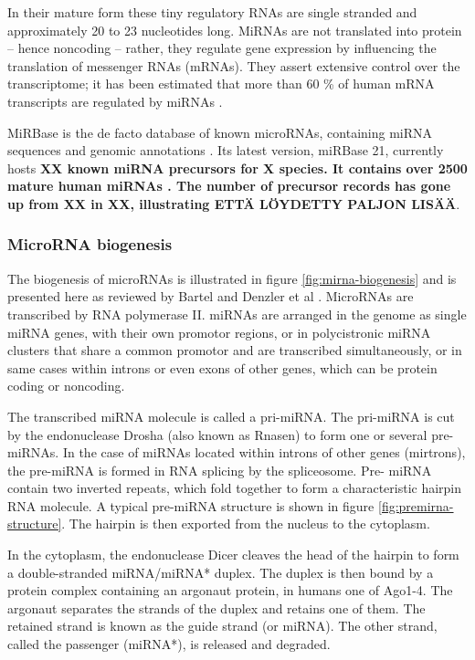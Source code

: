 In their mature form these tiny regulatory RNAs are single stranded and
approximately 20 to 23 nucleotides long. MiRNAs are not translated into
protein -- hence noncoding -- rather, they regulate gene expression by
influencing the translation of messenger RNAs (mRNAs). They assert
extensive control over the transcriptome; it has been estimated that more
than 60 \% of human mRNA transcripts are regulated by miRNAs
\cite{CITE}.

MiRBase is the de facto database of known microRNAs, containing miRNA
sequences and genomic annotations \cite{CITE}. Its latest version, miRBase 21,
currently hosts \textbf{XX known miRNA precursors for X species. It contains
over 2500 mature human miRNAs \cite{CITE}. The number of precursor records has
gone up from XX in XX, illustrating ETTÄ LÖYDETTY PALJON LISÄÄ}.





\subsubsection{MicroRNA biogenesis}\label{microrna-biogenesis}

The biogenesis of microRNAs is illustrated in figure
\ref{fig:mirna-biogenesis} and is presented here as reviewed by Bartel 
\cite{Bartel2004} and Denzler et al \cite{Denzler2015}. MicroRNAs are
transcribed by RNA polymerase II. miRNAs are arranged in the genome as
single miRNA genes, with their own promotor regions,
or in polycistronic miRNA clusters that share a common promotor and are
transcribed simultaneously, or in same cases within introns or even exons of
other genes, which can be protein coding or noncoding.

The transcribed miRNA molecule is called a pri-miRNA. The pri-miRNA is cut by
the endonuclease Drosha (also known as Rnasen) to form one or several pre-
miRNAs. In the case of miRNAs located within introns of other genes
(mirtrons), the pre-miRNA is formed in RNA splicing by the spliceosome. Pre-
miRNA contain two inverted repeats, which fold together to form a
characteristic hairpin RNA molecule. A typical pre-miRNA structure is shown in
figure \ref{fig:premirna-structure}. The hairpin is then exported from the
nucleus to the cytoplasm.

In the cytoplasm, the endonuclease Dicer cleaves the head of the hairpin to
form a double-stranded miRNA/miRNA* duplex. The duplex is then bound by a
protein complex containing an argonaut protein, in humans one of Ago1-4. The
argonaut separates the strands of the duplex and retains one of them. The
retained strand is known as the guide strand (or miRNA). The other strand,
called the passenger (miRNA*), is released and degraded.

